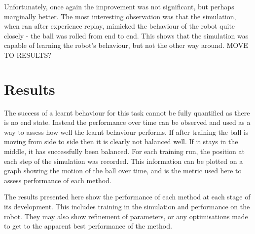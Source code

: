 \documentclass[12pt,a4paper]{article}
\begin{document}
Unfortunately, once again the improvement was not significant, but perhaps marginally better. The most interesting observation was that the simulation, when ran after experience replay, mimicked the behaviour of the robot quite closely - the ball was rolled from end to end. This shows that the simulation was capable of learning the robot's behaviour, but not the other way around. MOVE TO RESULTS?

\section{Results}
The success of a learnt behaviour for this task cannot be fully quantified as there is no end state. Instead the performance over time can be observed and used as a way to assess how well the learnt behaviour performs. If after training the ball is moving from side to side then it is clearly not balanced well. If it stays in the middle, it has successfully been balanced. For each training run, the position at each step of the simulation was recorded. This information can be plotted on a graph showing the motion of the ball over time, and is the metric used here to assess performance of each method. 

The results presented here show the performance of each method at each stage of its development. This includes training in the simulation and performance on the robot. They may also show refinement of parameters, or any optimisations made to get to the apparent best performance of the method. 
\end{document}
